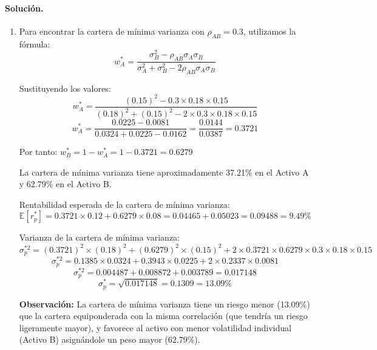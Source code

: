 \documentclass[12pt,a4paper]{article}
\newcommand{\E}{\mathbb{E}}
\newenvironment{solucion}{\paragraph{Solución.}}{}
\begin{document}
\begin{solucion}
\begin{enumerate}[label=\alph*)]
  El gráfico muestra cómo la volatilidad de la cartera disminuye al reducir la correlación entre los activos. Las curvas son más planas y se acercan al eje vertical conforme $\rho$ se vuelve negativa, y en el caso extremo $\rho=-1$ se puede alcanzar una volatilidad prácticamente nula.
  
  Adicionalmente:
  \begin{itemize}
    \item Cuando $\rho_{AB} = 1$ (correlación perfecta positiva), no hay diversificación: el riesgo es simplemente el promedio ponderado de las volatilidades individuales (16.5\%).
    \item A medida que la correlación disminuye, el riesgo de la cartera se reduce significativamente debido al efecto diversificación.
    \item Cuando $\rho_{AB} = -1$ (correlación perfecta negativa), es posible conseguir un riesgo muy bajo (1.5\%) mediante la combinación adecuada de activos.
    \item El beneficio de la diversificación aumenta a medida que la correlación disminuye, demostrando que la combinación de activos con baja o negativa correlación es fundamental para reducir el riesgo.
  \end{itemize}

  \item Para encontrar la cartera de mínima varianza con $\rho_{AB} = 0.3$, utilizamos la fórmula:
  \[
  w_A^* = \frac{\sigma_B^2 - \rho_{AB} \sigma_A \sigma_B}{\sigma_A^2 + \sigma_B^2 - 2\rho_{AB} \sigma_A \sigma_B}
  \]
  
  Sustituyendo los valores:
  \[
  w_A^* = \frac{(0.15)^2 - 0.3 \times 0.18 \times 0.15}{(0.18)^2 + (0.15)^2 - 2 \times 0.3 \times 0.18 \times 0.15}
  \]
  \[
  w_A^* = \frac{0.0225 - 0.0081}{0.0324 + 0.0225 - 0.0162} = \frac{0.0144}{0.0387} = 0.3721
  \]
  
  Por tanto: $w_B^* = 1 - w_A^* = 1 - 0.3721 = 0.6279$

  La cartera de mínima varianza tiene aproximadamente 37.21\% en el Activo A y 62.79\% en el Activo B.

  Rentabilidad esperada de la cartera de mínima varianza:
  \[
  \E[r_p^*] = 0.3721 \times 0.12 + 0.6279 \times 0.08 = 0.04465 + 0.05023 = 0.09488 = 9.49\%
  \]

  Varianza de la cartera de mínima varianza:
  \[
  \sigma_p^{*2} = (0.3721)^2 \times (0.18)^2 + (0.6279)^2 \times (0.15)^2 + 2 \times 0.3721 \times 0.6279 \times 0.3 \times 0.18 \times 0.15
  \]
  \[
  \sigma_p^{*2} = 0.1385 \times 0.0324 + 0.3943 \times 0.0225 + 2 \times 0.2337 \times 0.0081
  \]
  \[
  \sigma_p^{*2} = 0.004487 + 0.008872 + 0.003789 = 0.017148
  \]
  \[
  \sigma_p^* = \sqrt{0.017148} = 0.1309 = 13.09\%
  \]

  \textbf{Observación:} La cartera de mínima varianza tiene un riesgo menor (13.09\%) que la cartera equiponderada con la misma correlación (que tendría un riesgo ligeramente mayor), y favorece al activo con menor volatilidad individual (Activo B) asignándole un peso mayor (62.79\%).
\end{enumerate}
\end{solucion}
\end{document}

